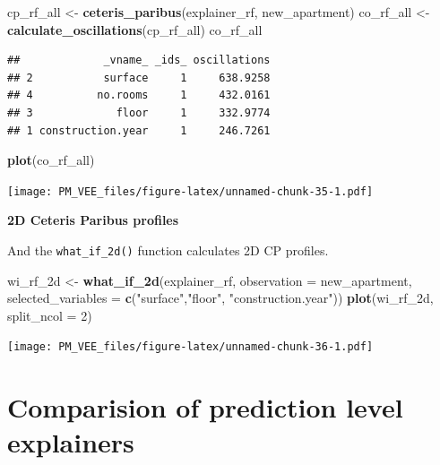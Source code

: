 \documentclass[]{krantz}
\newenvironment{Shaded}{\begin{snugshade}}{\end{snugshade}}
\newcommand{\DataTypeTok}[1]{\textcolor[rgb]{0.13,0.29,0.53}{#1}}
\newcommand{\DecValTok}[1]{\textcolor[rgb]{0.00,0.00,0.81}{#1}}
\newcommand{\KeywordTok}[1]{\textcolor[rgb]{0.13,0.29,0.53}{\textbf{#1}}}
\newcommand{\NormalTok}[1]{#1}
\newcommand{\StringTok}[1]{\textcolor[rgb]{0.31,0.60,0.02}{#1}}
\theoremstyle{definition}
\theoremstyle{definition}
\theoremstyle{definition}
\theoremstyle{remark}
\begin{document}
\begin{Shaded}
\begin{Highlighting}[]
\NormalTok{cp_rf_all <-}\StringTok{ }\KeywordTok{ceteris_paribus}\NormalTok{(explainer_rf, new_apartment)}
\NormalTok{co_rf_all <-}\StringTok{ }\KeywordTok{calculate_oscillations}\NormalTok{(cp_rf_all)}
\NormalTok{co_rf_all}
\end{Highlighting}
\end{Shaded}

\begin{verbatim}
##             _vname_ _ids_ oscillations
## 2           surface     1     638.9258
## 4          no.rooms     1     432.0161
## 3             floor     1     332.9774
## 1 construction.year     1     246.7261
\end{verbatim}

\begin{Shaded}
\begin{Highlighting}[]
\KeywordTok{plot}\NormalTok{(co_rf_all)}
\end{Highlighting}
\end{Shaded}

\texttt{[image: PM\_VEE\_files/figure-latex/unnamed-chunk-35-1.pdf]}

\textbf{2D Ceteris Paribus profiles}

And the \texttt{what\_if\_2d()} function calculates 2D CP profiles.

\begin{Shaded}
\begin{Highlighting}[]
\NormalTok{wi_rf_2d <-}\StringTok{ }\KeywordTok{what_if_2d}\NormalTok{(explainer_rf, }\DataTypeTok{observation =}\NormalTok{ new_apartment, }
                 \DataTypeTok{selected_variables =} \KeywordTok{c}\NormalTok{(}\StringTok{"surface"}\NormalTok{,}\StringTok{"floor"}\NormalTok{, }\StringTok{"construction.year"}\NormalTok{))}
\KeywordTok{plot}\NormalTok{(wi_rf_2d, }\DataTypeTok{split_ncol =} \DecValTok{2}\NormalTok{)}
\end{Highlighting}
\end{Shaded}

\texttt{[image: PM\_VEE\_files/figure-latex/unnamed-chunk-36-1.pdf]}

\hypertarget{comparision-of-prediction-level-explainers}{%
\section{Comparision of prediction level
explainers}\label{comparision-of-prediction-level-explainers}}
\end{document}

